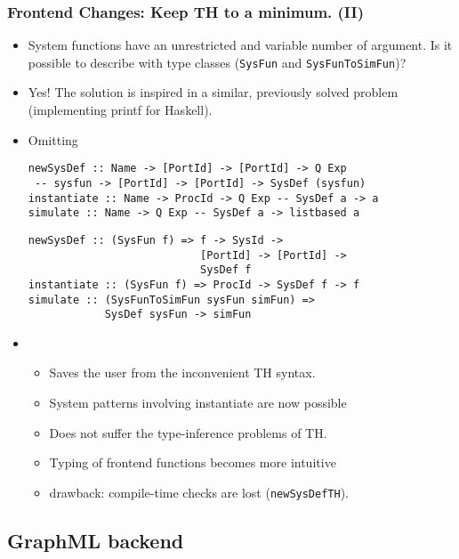 \documentclass{beamer}
\begin{document}
\begin{frame}[fragile]
  \frametitle{Frontend Changes: Keep TH to a minimum. (II)}
  \begin{itemize}
  \item<1-> System functions have an unrestricted and variable number of
    argument. Is it possible to describe with type classes
    (\texttt{SysFun} and \texttt{SysFunToSimFun})?
  \item Yes! The solution is inspired in a similar, previously solved
    problem (implementing printf for Haskell).
  \item Omitting 

\begin{lstlisting}
newSysDef :: Name -> [PortId] -> [PortId] -> Q Exp
 -- sysfun -> [PortId] -> [PortId] -> SysDef (sysfun)
instantiate :: Name -> ProcId -> Q Exp -- SysDef a -> a
simulate :: Name -> Q Exp -- SysDef a -> listbased a 
\end{lstlisting}
\begin{lstlisting}
newSysDef :: (SysFun f) => f -> SysId -> 
                           [PortId] -> [PortId] ->
                           SysDef f
instantiate :: (SysFun f) => ProcId -> SysDef f -> f
simulate :: (SysFunToSimFun sysFun simFun) => 
            SysDef sysFun -> simFun
\end{lstlisting}

\item<2->     
  \begin{itemize}
  \item Saves the user from the inconvenient TH syntax.
  \item System patterns involving instantiate are now possible
  \item Does not suffer the type-inference problems of TH.
  \item Typing of frontend functions becomes more intuitive
  \item \alert{drawback}: compile-time checks are lost (\texttt{newSysDefTH}).
  \end{itemize}
\end{itemize}
\end{frame}


\subsection{GraphML backend}
\end{document}

